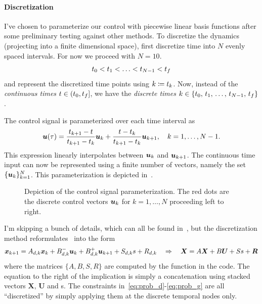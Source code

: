 \documentclass[10pt]{article}
\begin{document}
\paragraph{Discretization}

I've chosen to parameterize our control with piecewise linear basis functions after some preliminary testing against other methods. To discretize the dynamics (projecting into a finite dimensional space), first discretize time into $N$ evenly spaced intervals. For now we proceed with $N=10$. 
\begin{equation}
t_0 < t_1 < \ldots < t_{N-1} < t_f
\end{equation}
and represent the discretized time points using $k \coloneqq t_k$. Now, instead of the \textit{continuous times} $t\in(t_0,t_f]$, we have the \textit{discrete times} $k\in\{t_0,\,t_1,\,\ldots,\,t_{N-1},\,t_f\}$.

The control signal is parameterized over each time interval as
\begin{equation}
\bm{u}(\tau) = \frac{t_{k+1} - t}{t_{k+1}-t_k} \bm{u}_k + \frac{t-t_k}{t_{k+1}-t_k} \bm{u}_{k+1}, \quad k=1,\ldots,N-1.
\end{equation}
This expression linearly interpolates between $\bm{u}_k$ and $\bm{u}_{k+1}$. The continuous time input can now be represented using a finite number of vectors, namely the set $\{\bm{u}_{k}\}_{k=1}^{N}$. This parameterization is depicted in~.

\begin{figure}
\centering
\caption{Depiction of the control signal parameterization. The red dots are the discrete control vectors $\bm{u}_{k}$ for $k=1,\ldots,N$ proceeding left to right.}
\label{fig:ctrl_param}
\end{figure}

I'm skipping a bunch of details, which can all be found in~\cite{SzmukReynolds2018,Reynolds2019b}, but the discretization method reformulates~ into the form
\begin{equation}
\bm{x}_{k+1} = A_{d,k} \bm{x}_{k} + B_{d,k}^- \bm{u}_k + B_{d,k}^+ \bm{u}_{k+1} + S_{d,k} s + R_{d,k} \quad \Rightarrow \quad \bm{X} = A \bm{X} + B \bm{U} + S s + \bm{R}
\label{eq:discrete_dynamics}
\end{equation}
where the matrices $\{A,B,S,R\}$ are computed by the function  in the code. The equation to the right of the implication is simply a concatenation using stacked vectors $\bm{X},\,\bm{U}$ and s. The constraints in~\eqref{eq:prob_d}-\eqref{eq:prob_g} are all ``discretized'' by simply applying them at the discrete temporal nodes only. 
\end{document}
